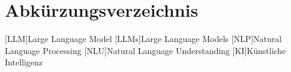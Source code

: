 \documentclass[a4paper, 12pt]{article}
\newcounter{lastromanpage}
\begin{document}

\newpage
{}
\tableofcontents
\newpage
\section*{Abkürzungsverzeichnis}
\begin{acronym}[BERT]
    [LLM]{Large Language Model}
    [LLMs]{Large Language Models}
    [NLP]{Natural Language Processing}
    [NLU]{Natural Language Understanding}
    [KI]{Künstliche Intelligenz}
\end{acronym}
\newpage
\setcounter{lastromanpage}{\value{page}} %











\newpage
{}
\setcounter{page}{\value{lastromanpage}} %

\newpage
{} %
\printbibliography[title={Literaturverzeichnis}, heading=bibintoc]
\end{document}
